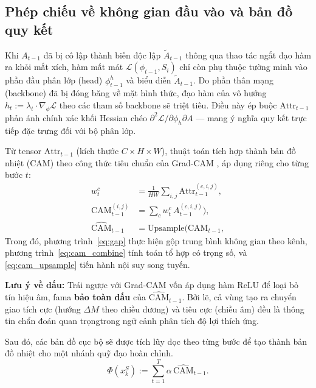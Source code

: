 \subsection{Phép chiếu về không gian đầu vào và bản đồ quy kết}
\label{subsec:projection}

Khi $A_{t-1}$ đã bị cô lập thành biến độc lập $\tilde{A}_{t-1}$ thông qua thao tác ngắt đạo hàm ra khỏi mắt xích, hàm mất mát $\mathcal{L}(\phi_{t-1}, S_i)$ chỉ còn phụ thuộc tường minh vào phần đầu phân lớp (head) $\phi_{t-1}^h$ và biểu diễn $\tilde{A}_{t-1}$. Do phần thân mạng (backbone) đã bị đóng băng về mặt hình thức, đạo hàm của vô hướng $h_{t} := \lambda_t \cdot \nabla_\phi \mathcal{L}$ theo các tham số backbone sẽ triệt tiêu. Điều này ép buộc $\mathrm{Attr}_{t-1}$ phản ánh chính xác khối Hessian chéo $\partial^2 \mathcal{L}/\partial \phi_h \partial A$ — mang ý nghĩa quy kết trực tiếp đặc trưng đối với bộ phân lớp.

Từ tensor $\mathrm{Attr}_{t-1}$ (kích thước $C \times H \times W$), thuật toán tích hợp thành bản đồ nhiệt (CAM) theo công thức tiêu chuẩn của Grad-CAM \cite{selvaraju2020grad}, áp dụng riêng cho từng bước $t$:
\begin{align}
    w_t^c &= \frac{1}{HW}\sum_{i,j} \mathrm{Attr}_{t-1}^{(c,i,j)}, \label{eq:gap}\\
    \mathrm{CAM}_{t-1}^{(i,j)} &= \sum_{c} w_t^{c}\, A_{t-1}^{(c,i,j)}), \label{eq:cam_combine}\\
    \widehat{\mathrm{CAM}}_{t-1} &= \mathrm{Upsample}\big(\mathrm{CAM}_{t-1}, \label{eq:cam_upsample}
\end{align}
Trong đó, phương trình~\eqref{eq:gap} thực hiện gộp trung bình không gian theo kênh, phương trình~\eqref{eq:cam_combine} tính toán tổ hợp có trọng số, và \eqref{eq:cam_upsample} tiến hành nội suy song tuyến.

\textbf{Lưu ý về dấu:} Trái ngược với Grad-CAM vốn áp dụng hàm $\mathrm{ReLU}$ để loại bỏ tín hiệu âm, \acrshort{fama} \textbf{bảo toàn dấu} của $\widehat{\mathrm{CAM}}_{t-1}$. Bởi lẽ, cả vùng tạo ra chuyển giao tích cực (hướng $\Delta M$ theo chiều dương) và tiêu cực (chiều âm) đều là thông tin chẩn đoán quan trọngtrong ngữ cảnh phân tích độ lợi thích ứng.

Sau đó, các bản đồ cục bộ sẽ được tích lũy dọc theo từng bước để tạo thành bản đồ nhiệt cho một nhánh quỹ đạo hoàn chỉnh.
\begin{equation}
    \Phi(x_k^S) := \sum_{t=1}^{T} \alpha \, \widehat{\mathrm{CAM}}_{t-1}.
    \label{eq:branch_saliency}
\end{equation}

